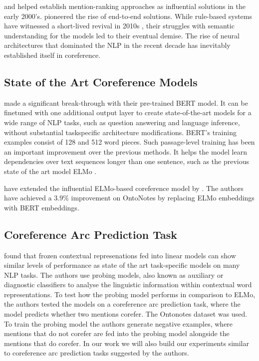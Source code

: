 \documentclass[11pt]{article}
\begin{document}
\textcite{yang2003coref} and \textcite{iida2003incorporating} helped establish mention-ranking approaches as influential solutions in the early 2000's. \textcite{ng2005b} pioneered the rise of end-to-end solutions. While rule-based systems have witnessed a short-lived revival in 2010s \parencite{zhou2014; haghighi2009}, their struggles with semantic understanding for the models led to their eventual demise.  The rise of neural architectures that dominated the NLP in the recent decade has inevitably established itself in coreference. 

\subsection{State of the Art Coreference Models}


\textcite{devlin2019bert} made a significant break-through with their pre-trained BERT model. It can be finetuned with one additional output layer
to create state-of-the-art models for a wide
range of NLP tasks, such as question answering and language inference, without substantial taskspecific architecture modifications. BERT's training examples consist of 128 and 512 word pieces. Such passage-level training has been an important improvement over the previous methods. It helps the model learn dependencies over text sequences longer than one sentence, such as the previous state of the art model ELMo \parencite{peters2018elmo}.

\textcite{devlin2019bert} have extended the influential ELMo-based coreference model by \textcite{lee2018higher}. The authors have achieved a 3.9\% improvement on OntoNotes by replacing ELMo embeddings with BERT embeddings. 

\subsection{Coreference Arc Prediction Task}

 \textcite{liu2019linguistic} found that frozen contextual represenations fed into linear models can show similar levels of performance as state of the art task-specific models on many NLP tasks. The authors use probing models, also known as auxiliary or diagnostic classifiers \parencite{shi2016string, kadar2017representation} to analyse the linguistic information within contextual word representations. To test how the probing model performs in comparison to ELMo, the authors tested the models on a coreference arc prediction task, where the model predicts whether two mentions corefer. The Ontonotes dataset was used. To train the probing model the authors generate negative examples, where mentions that do not corefer are fed into the probing model alongside the mentions that do corefer. In our work we will also build our experiments similar to coreference arc prediction tasks suggested by the authors.
\end{document}
